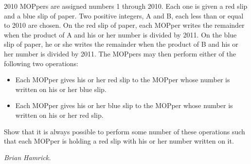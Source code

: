 2010 MOPpers are assigned numbers 1 through 2010. Each one is given a red slip and a blue slip of paper. Two positive integers, A and B, each less than or equal to 2010 are chosen. On the red slip of paper, each MOPper writes the remainder when the product of A and his or her number is divided by 2011. On the blue slip of paper, he or she writes the remainder when the product of B and his or her number is divided by 2011. The MOPpers may then perform either of the following two operations:
\begin{itemize}
	\item Each MOPper gives his or her red slip to the MOPper whose number is written on his or her blue slip.
	\item Each MOPper gives his or her blue slip to the MOPper whose number is written on his or her red slip.
\end{itemize}
Show that it is always possible to perform some number of these operations such that each MOPper is holding a red slip with his or her number written on it.

\textit{Brian Hamrick.}
